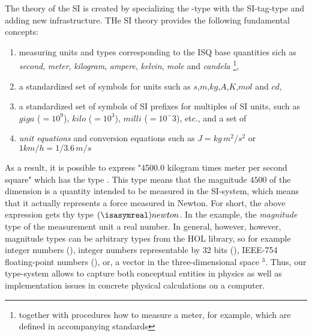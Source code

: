 \documentclass[11pt,a4paper]{book}
\begin{document}
The theory of the SI is created by specializing the -type with the 
SI-tag-type and adding new infrastructure. THe SI theory provides the following fundamental 
concepts:
\begin{enumerate}%
\item measuring units and types corresponding to the ISQ base quantities sich
      as \emph{second}, \emph{meter}, \emph{kilogram}, \emph{ampere}, \emph{kelvin}, \emph{mole} and
      \emph{candela} \footnote{together with procedures how to measure a meter, for example, which are
      defined in accompanying standards},
\item a standardized set of symbols for units such as $s$,$m$,$kg$,$A$,$K$,$mol$ and $cd$,
\item a standardized set of symbols of SI prefixes for multiples of SI units, such as 
      $giga$ ($=10^9$), $kilo$ ($=10^3$), $milli$ ($=10^-3$), etc., and a set of
\item \emph{unit equations} and conversion equations such as $J = kg\,m^2/s^2$ or $1 km/h = 1/3.6\,m/s$
\end{enumerate}

As a result, it is possible to express "4500.0 kilogram times meter per second square" which has 
the type 
. 
This type means that the magnitude $4500$ of the dimension 
 is a quantity intended to be measured in the SI-system, which means that it actually
represents a force measured in Newton. For short, the above expression gets thy type $(\isasymreal)newton$.
In the example, the \emph{magnitude} type of the measurement unit a real number. 
In general, however, however, magnitude types can be arbitrary types from the HOL library, so 
for example integer numbers (), integer numbers representable by 32 bits (), 
IEEE-754 floating-point numbers (), or, 
a vector in the three-dimensional space  \isa{\isasymreal}$^3$. Thus, our type-system allows
to capture both conceptual entities in physics as well as 
implementation issues in concrete physical calculations on a computer.
\end{document}
